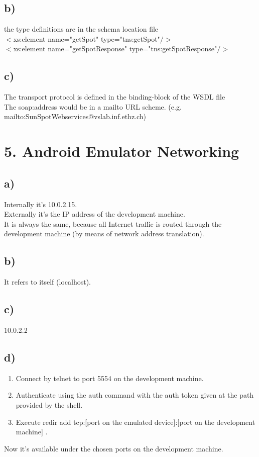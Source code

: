 \documentclass[10pt,a4paper]{article}
\begin{document}
			
		\subsection*{b)}
			the type definitions are in the schema location file \\
			$<$xs:element name="getSpot" type="tns:getSpot"$/>$ \\
			$<$xs:element name="getSpotResponse" type="tns:getSpotResponse"$/>$\\
			
		\subsection*{c)}
			The transport protocol is defined in the binding-block of the WSDL file \\
			The soap:address would be in a mailto URL scheme. (e.g. mailto:SunSpotWebservices@vslab.inf.ethz.ch)\\
			
		
	\section*{5. Android Emulator Networking}
		\subsection*{a)}
			Internally it's 10.0.2.15.\\
			Externally it's the IP address of the development machine. \\
			It is always the same, because all Internet traffic is routed through the development machine (by means of network address translation).\\ 
			
		\subsection*{b)}
			It refers to itself (localhost).\\
			
		\subsection*{c)}
			10.0.2.2\\
			
		\subsection*{d)}
			\begin{enumerate}
				\item Connect by telnet to port 5554 on the development machine.
				\item Authenticate using the auth command with the auth token given at the path provided by the shell.
				\item Execute redir add tcp:[port on the emulated device]:[port on the development machine] .
			\end{enumerate}
			Now it's available under the chosen ports on the development machine.
	
\end{document}
